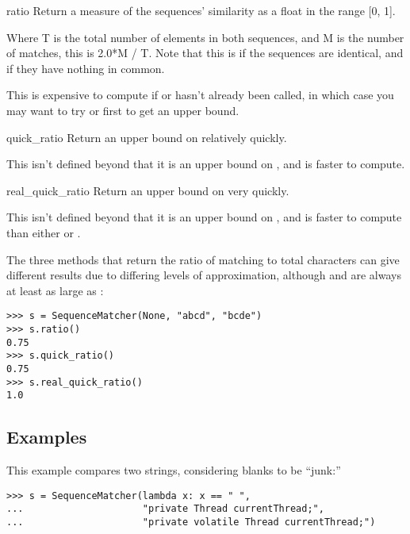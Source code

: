 \begin{methoddesc}{ratio}{}
  Return a measure of the sequences' similarity as a float in the
  range [0, 1].

  Where T is the total number of elements in both sequences, and M is
  the number of matches, this is 2.0*M / T. Note that this is 
  if the sequences are identical, and  if they have nothing in
  common.

  This is expensive to compute if  or
   hasn't already been called, in which case you
  may want to try  or
   first to get an upper bound.
\end{methoddesc}

\begin{methoddesc}{quick_ratio}{}
  Return an upper bound on  relatively quickly.

  This isn't defined beyond that it is an upper bound on
  , and is faster to compute.
\end{methoddesc}

\begin{methoddesc}{real_quick_ratio}{}
  Return an upper bound on  very quickly.

  This isn't defined beyond that it is an upper bound on
  , and is faster to compute than either
   or .
\end{methoddesc}

The three methods that return the ratio of matching to total characters
can give different results due to differing levels of approximation,
although  and  are always
at least as large as :

\begin{verbatim}
>>> s = SequenceMatcher(None, "abcd", "bcde")
>>> s.ratio()
0.75
>>> s.quick_ratio()
0.75
>>> s.real_quick_ratio()
1.0
\end{verbatim}


\subsection{Examples \label{difflib-examples}}


This example compares two strings, considering blanks to be ``junk:''

\begin{verbatim}
>>> s = SequenceMatcher(lambda x: x == " ",
...                     "private Thread currentThread;",
...                     "private volatile Thread currentThread;")
\end{verbatim}

